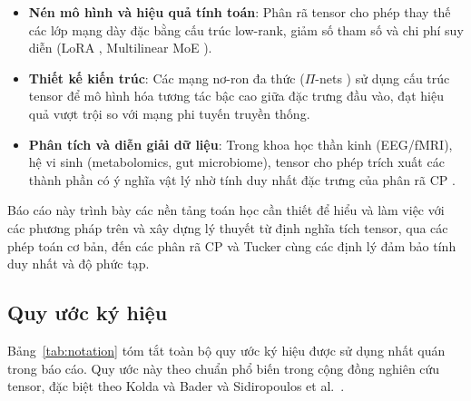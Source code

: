 \begin{itemize}
    \item \textbf{Nén mô hình và hiệu quả tính toán}: Phân rã tensor cho phép thay thế các lớp mạng dày đặc bằng cấu trúc low-rank, giảm số tham số và chi phí suy diễn (LoRA \cite{hu2022lora}, Multilinear MoE \cite{oldfield2024multilinear}).
    \item \textbf{Thiết kế kiến trúc}: Các mạng nơ-ron đa thức ($\Pi$-nets \cite{chrysos2020pi}) sử dụng cấu trúc tensor để mô hình hóa tương tác bậc cao giữa đặc trưng đầu vào, đạt hiệu quả vượt trội so với mạng phi tuyến truyền thống.
    \item \textbf{Phân tích và diễn giải dữ liệu}: Trong khoa học thần kinh (EEG/fMRI), hệ vi sinh (metabolomics, gut microbiome), tensor cho phép trích xuất các thành phần có ý nghĩa vật lý nhờ tính duy nhất đặc trưng của phân rã CP \cite{kruskal1977three}.
\end{itemize}

Báo cáo này trình bày các nền tảng toán học cần thiết để hiểu và làm việc với các phương pháp trên và xây dựng lý thuyết từ định nghĩa tích tensor, qua các phép toán cơ bản, đến các phân rã CP và Tucker cùng các định lý đảm bảo tính duy nhất và độ phức tạp.

\subsection{Quy ước ký hiệu}
\label{sec:notation}

Bảng~\ref{tab:notation} tóm tắt toàn bộ quy ước ký hiệu được sử dụng nhất quán trong báo cáo. Quy ước này theo chuẩn phổ biến trong cộng đồng nghiên cứu tensor, đặc biệt theo Kolda và Bader \cite{kolda2009tensor} và Sidiropoulos et al.\ \cite{sidiropoulos2017tensor}.

